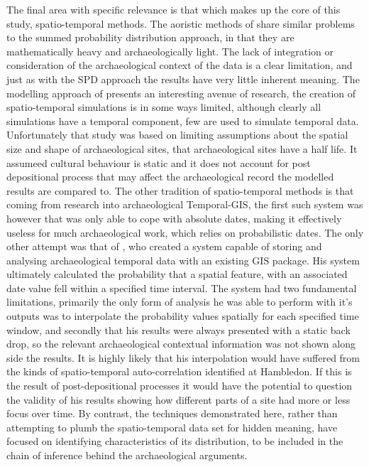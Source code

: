 The final area with specific relevance is that which makes up the core of this study, spatio-temporal methods. The aoristic methods of \citet{Johnson:2004fk,Crema20101118} share similar problems to the summed probability distribution approach, in that they are mathematically heavy and archaeologically light. The lack of integration or consideration of the archaeological context of the data is a clear limitation, and just as with the SPD approach the results have very little inherent meaning. The modelling approach of \citet{Demjn2016100} presents an interesting avenue of research, the creation of spatio-temporal simulations is in some ways limited, although clearly all simulations have a temporal component, few are used to simulate temporal data. Unfortunately that study was based on limiting assumptions about the spatial size and shape of archaeological sites, that archaeological sites have a half life. It assumeed cultural behaviour is static and it does not account for post depositional process that may affect the archaeological record the modelled results are compared to. The other tradition of spatio-temporal methods is that coming from research into archaeological Temporal-GIS, the first such system was \citet{Johnson:1999cr} however that was only able to cope with absolute dates, making it effectively useless for much archaeological work, which relies on probabilistic dates. The only other attempt was that of \citet{Green:2008fk}, who created a system capable of storing and analysing archaeological temporal data with an existing GIS package. His system ultimately calculated the probability that a spatial feature, with an associated date value fell within a specified time interval. The system had two fundamental limitations, primarily the only form of analysis he was able to perform with it's outputs was to interpolate the probability values spatially for each specified time window, and secondly that his results were always presented with a static back drop, so the relevant archaeological contextual information was not shown along side the results. It is highly likely that his interpolation would have suffered from the kinds of spatio-temporal auto-correlation identified at Hambledon. If this is the result of post-depositional processes it would have the potential to question the validity of his results showing how different parts of a site had more or less focus over time. By contrast, the techniques demonstrated here, rather than attempting to plumb the spatio-temporal data set for hidden meaning, have focused on identifying characteristics of its distribution, to be included in the chain of inference behind the archaeological arguments.

